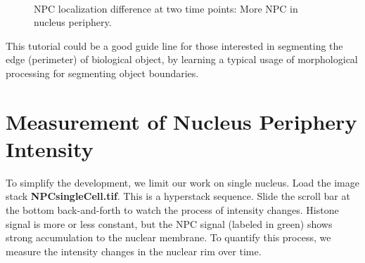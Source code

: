 \documentclass[11pt,a4paper,oneside]{report}
\begin{document}
\begin{figure}[htbp]
 \centering
 \quad
  \\
 \caption{NPC localization difference at two time points: More NPC in nucleus periphery. }
 \label{fig:NucStrategy}
\end{figure}

This tutorial could be a good guide line for those interested in segmenting the edge (perimeter) of biological object, by learning a typical usage of morphological processing for segmenting object boundaries. 

\section{Measurement of Nucleus Periphery Intensity}

To simplify the development, we limit our work on single nucleus. Load the image stack \textbf{NPCsingleCell.tif}. This is a hyperstack sequence. Slide the scroll bar at the bottom back-and-forth to watch the process of intensity changes. Histone signal is more or less constant, but the NPC signal (labeled in green) shows strong accumulation to the nuclear membrane. To quantify this process, we measure the intensity changes in the nuclear rim over time.
\end{document}

